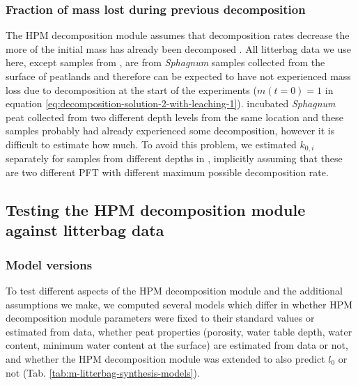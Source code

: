 \documentclass[esd, manuscript]{copernicus}
\begin{document}
\hypertarget{sdm-003-methods-6}{%
\subsubsection{Fraction of mass lost during previous decomposition}\label{sdm-003-methods-6}}

The HPM decomposition module assumes that decomposition rates decrease the more of the initial mass has already been decomposed \citep{Frolking.2001, Frolking.2010}. All litterbag data we use here, except samples from \citet{Prevost.1997}, are from \emph{Sphagnum} samples collected from the surface of peatlands and therefore can be expected to have not experienced mass loss due to decomposition at the start of the experiments (\(m(t = 0) = 1\) in equation \eqref{eq:decomposition-solution-2-with-leaching-1}). \citet{Prevost.1997} incubated \emph{Sphagnum} peat collected from two different depth levels from the same location and these samples probably had already experienced some decomposition, however it is difficult to estimate how much. To avoid this problem, we estimated \(k_{0,i}\) separately for samples from different depths in \citet{Prevost.1997}, implicitly assuming that these are two different PFT with different maximum possible decomposition rate.

\hypertarget{sdm-003-methods-7}{%
\subsection{Testing the HPM decomposition module against litterbag data}\label{sdm-003-methods-7}}

\hypertarget{sdm-003-methods-8}{%
\subsubsection{Model versions}\label{sdm-003-methods-8}}

To test different aspects of the HPM decomposition module and the additional assumptions we make, we computed several models which differ in whether HPM decomposition module parameters were fixed to their standard values or estimated from data, whether peat properties (porosity, water table depth, water content, minimum water content at the surface) are estimated from data or not, and whether the HPM decomposition module was extended to also predict \(l_0\) or not (Tab. \ref{tab:m-litterbag-synthesis-models}).
\end{document}
